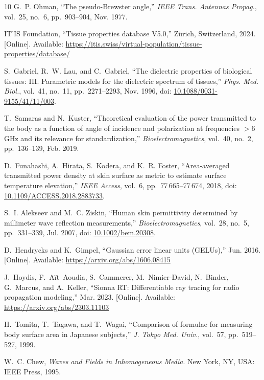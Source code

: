 \documentclass[journal,twocolumn,10pt]{IEEEtran}
\newcommand*{\doi}[1]{\href{https://doi.org/#1}{#1}}
\theoremstyle{plain}
\begin{document}
\begin{thebibliography}{10}
G.~P. Ohman, ``The pseudo-Brewster angle,'' \emph{IEEE Trans. Antennas
  Propag.}, vol.~25, no.~6, pp.~903--904, Nov. 1977.

IT'IS Foundation, ``Tissue properties database V5.0,'' Z\"urich,
  Switzerland, 2024. [Online]. Available:
  \url{https://itis.swiss/virtual-population/tissue-properties/database/}

S.~Gabriel, R.~W. Lau, and C.~Gabriel, ``The dielectric properties of
  biological tissues: III. Parametric models for the dielectric spectrum
  of tissues,'' \emph{Phys. Med. Biol.}, vol.~41, no.~11,
  pp.~2271--2293, Nov. 1996, doi: \doi{10.1088/0031-9155/41/11/003}.

T.~Samaras and N.~Kuster, ``Theoretical evaluation of the power
  transmitted to the body as a function of angle of incidence and
  polarization at frequencies ${>}$6\,GHz and its relevance for
  standardization,'' \emph{Bioelectromagnetics}, vol.~40, no.~2,
  pp.~136--139, Feb. 2019.

D.~Funahashi, A.~Hirata, S.~Kodera, and K.~R. Foster, ``Area-averaged
  transmitted power density at skin surface as metric to estimate
  surface temperature elevation,'' \emph{IEEE Access}, vol.~6,
  pp.~77\,665--77\,674, 2018,
  doi: \doi{10.1109/ACCESS.2018.2883733}.

S.~I. Alekseev and M.~C. Ziskin, ``Human skin permittivity determined
  by millimeter wave reflection measurements,''
  \emph{Bioelectromagnetics}, vol.~28, no.~5, pp.~331--339, Jul. 2007,
  doi: \doi{10.1002/bem.20308}.

D.~Hendrycks and K.~Gimpel, ``Gaussian error linear units (GELUs),''
  Jun. 2016. [Online]. Available: \url{https://arxiv.org/abs/1606.08415}

J.~Hoydis, F.~A\"{i}t~Aoudia, S.~Cammerer, M.~Nimier-David, N.~Binder,
  G.~Marcus, and A.~Keller, ``Sionna RT: Differentiable ray tracing for
  radio propagation modeling,'' Mar. 2023. [Online]. Available:
  \url{https://arxiv.org/abs/2303.11103}

H.~Tomita, T.~Tagawa, and T.~Wagai, ``Comparison of formulae for
  measuring body surface area in Japanese subjects,'' \emph{J. Tokyo
  Med. Univ.}, vol.~57, pp.~519--527, 1999.

W.~C. Chew, \emph{Waves and Fields in Inhomogeneous Media}.
  New York, NY, USA: IEEE Press, 1995.


\end{thebibliography}
\end{document}
